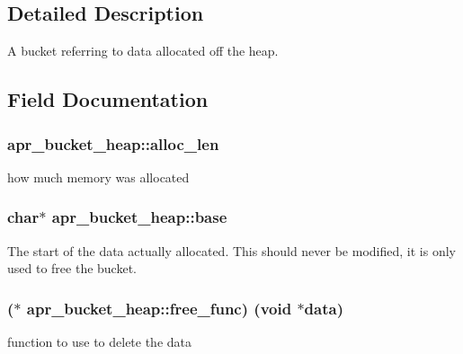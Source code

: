 \subsection{Detailed Description}
A bucket referring to data allocated off the heap. 

\subsection{Field Documentation}
\subsubsection[{\texorpdfstring{alloc\+\_\+len}{alloc_len}}]{ apr\+\_\+bucket\+\_\+heap\+::alloc\+\_\+len}\hypertarget{structapr__bucket__heap_ae373dada96f2e005a6aaf80e41c4cf6d}{}\label{structapr__bucket__heap_ae373dada96f2e005a6aaf80e41c4cf6d}
how much memory was allocated 
\subsubsection[{\texorpdfstring{base}{base}}]{\setlength{\rightskip}{0pt plus 5cm}char$\ast$ apr\+\_\+bucket\+\_\+heap\+::base}\hypertarget{structapr__bucket__heap_ac6386e2f635c6af19075123749e1fa71}{}\label{structapr__bucket__heap_ac6386e2f635c6af19075123749e1fa71}
The start of the data actually allocated. This should never be modified, it is only used to free the bucket. 
\subsubsection[{\texorpdfstring{free\+\_\+func}{free_func}}]{($\ast$ apr\+\_\+bucket\+\_\+heap\+::free\+\_\+func) ({\bf void} $\ast${\bf data})}\hypertarget{structapr__bucket__heap_ad180e40bfdc962bab946f764be9f6f88}{}\label{structapr__bucket__heap_ad180e40bfdc962bab946f764be9f6f88}
function to use to delete the data 
